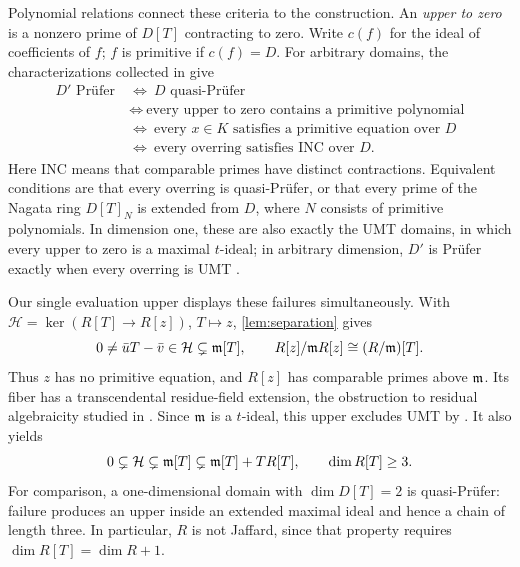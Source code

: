 Polynomial relations connect these criteria to the construction.
An \emph{upper to zero} is a nonzero prime of $D[T]$ contracting to zero.
Write $c(f)$ for the ideal of coefficients of $f$; $f$ is primitive if
$c(f)=D$. For arbitrary domains, the characterizations collected in
\cite[Thm.~1.1]{ChangFontana2009} give
\[
\begin{aligned}
 D'\text{ Pr\"ufer}
 &\ \Longleftrightarrow\ D\text{ quasi-Pr\"ufer}\\
 &\ \Longleftrightarrow\ \text{every upper to zero contains a primitive polynomial}\\
 &\ \Longleftrightarrow\ \text{every }x\in K\text{ satisfies a primitive equation over }D\\
 &\ \Longleftrightarrow\ \text{every overring satisfies INC over }D.
\end{aligned}
\]
Here INC means that comparable primes have distinct contractions.
Equivalent conditions are that every overring is quasi-Pr\"ufer, or that
every prime of the Nagata ring $D[T]_N$ is extended from $D$, where $N$
consists of primitive polynomials. In dimension one, these are also
exactly the UMT domains, in which every upper to zero is a maximal
$t$-ideal; in arbitrary dimension, $D'$ is Pr\"ufer exactly when every
overring is UMT \cite[Thms.~1.1, 1.5, Cor.~3.11]{FontanaGabelliHouston1998}.

Our single evaluation upper displays these failures simultaneously.
With $\mathcal H=\ker(R[T]\to R[z])$, $T\mapsto z$,
\cref{lem:separation} gives
\begin{equation}\label{eq:literature-obstruction}
 0\ne\bar uT-\bar v\in\mathcal H\subsetneq\mathfrak m[T],\qquad
 R[z]/\mathfrak m R[z]\cong(R/\mathfrak m)[T].
\end{equation}
Thus $z$ has no primitive equation, and $R[z]$ has comparable primes
above $\mathfrak m$. Its fiber has a transcendental residue-field extension,
the obstruction to residual algebraicity studied in
\cite[Thm.~2.3, Cor.~2.8]{AyacheJaballah1997}.
Since $\mathfrak m$ is a $t$-ideal, this upper excludes UMT by
\cite[Thm.~1.1]{FontanaGabelliHouston1998}. It also yields
\[
 0\subsetneq\mathcal H\subsetneq\mathfrak m[T]
   \subsetneq\mathfrak m[T]+TR[T],\qquad \dim R[T]\geq3.
\]
For comparison, a one-dimensional domain with $\dim D[T]=2$ is
quasi-Pr\"ufer: failure produces an upper inside an extended maximal
ideal and hence a chain of length three. In particular, $R$ is not
Jaffard, since that property requires $\dim R[T]=\dim R+1$.


